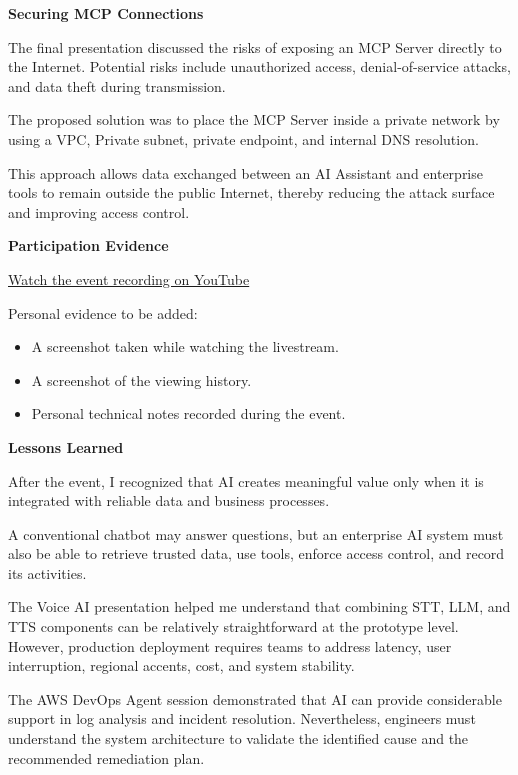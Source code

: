 \vspace{0.5em}\noindent\textbf{Securing MCP Connections}\par

The final presentation discussed the risks of exposing an MCP Server
directly to the Internet. Potential risks include unauthorized access,
denial-of-service attacks, and data theft during transmission.

The proposed solution was to place the MCP Server inside a private
network by using a VPC, Private subnet, private endpoint, and internal
DNS resolution.

This approach allows data exchanged between an AI Assistant and
enterprise tools to remain outside the public Internet, thereby reducing
the attack surface and improving access control.

\vspace{0.5em}\noindent\textbf{Participation Evidence}\par

\href{https://www.youtube.com/live/G8-WlI7f6dE?si=4tnIqB3yrCUW6yjv}{Watch
the event recording on YouTube}

Personal evidence to be added:

\begin{itemize}
\tightlist
\item
  A screenshot taken while watching the livestream.
\item
  A screenshot of the viewing history.
\item
  Personal technical notes recorded during the event.
\end{itemize}

\vspace{0.5em}\noindent\textbf{Lessons Learned}\par

After the event, I recognized that AI creates meaningful value only when
it is integrated with reliable data and business processes.

A conventional chatbot may answer questions, but an enterprise AI system
must also be able to retrieve trusted data, use tools, enforce access
control, and record its activities.

The Voice AI presentation helped me understand that combining STT, LLM,
and TTS components can be relatively straightforward at the prototype
level. However, production deployment requires teams to address latency,
user interruption, regional accents, cost, and system stability.

The AWS DevOps Agent session demonstrated that AI can provide
considerable support in log analysis and incident resolution.
Nevertheless, engineers must understand the system architecture to
validate the identified cause and the recommended remediation plan.

